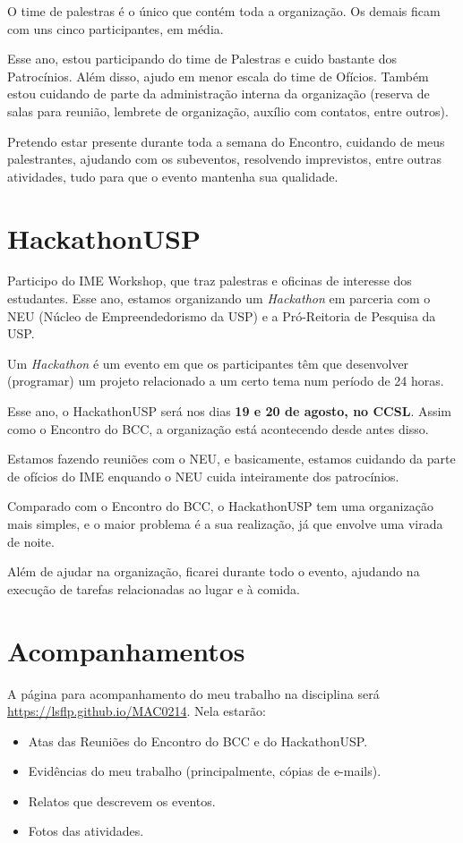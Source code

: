 \documentclass[12pt,letterpaper]{article}
\begin{document}
	O time de palestras é o único que contém toda a organização. Os demais ficam com uns cinco participantes, em média. 
	
	Esse ano, estou participando do time de Palestras e cuido bastante dos Patrocínios. Além disso, ajudo em menor escala do time de Ofícios. Também estou cuidando de parte da administração interna da organização (reserva de salas para reunião, lembrete de organização, auxílio com contatos, entre outros).
	
	Pretendo estar presente durante toda a semana do Encontro, cuidando de meus palestrantes, ajudando com os subeventos, resolvendo imprevistos, entre outras atividades, tudo para que o evento mantenha sua qualidade.
	
	\section{HackathonUSP}
	
	Participo do IME Workshop, que traz palestras e oficinas de interesse dos estudantes. Esse ano, estamos organizando um \textit{Hackathon} em parceria com o NEU (Núcleo de Empreendedorismo da USP) e a Pró-Reitoria de Pesquisa da USP.
	
	Um \textit{Hackathon} é um evento em que os participantes têm que desenvolver (programar) um projeto relacionado a um certo tema num período de 24 horas. 
	
	Esse ano, o HackathonUSP será nos dias \textbf{19 e 20 de agosto, no CCSL}. Assim como o Encontro do BCC, a organização está acontecendo desde antes disso. 
	
	Estamos fazendo reuniões com o NEU, e basicamente, estamos cuidando da parte de ofícios do IME enquando o NEU cuida inteiramente dos patrocínios.
	
	Comparado com o Encontro do BCC, o HackathonUSP tem uma organização mais simples, e o maior problema é a sua realização, já que envolve uma virada de noite. 
	
	Além de ajudar na organização, ficarei durante todo o evento, ajudando na execução de tarefas relacionadas ao lugar e à comida.
	
	\section{Acompanhamentos}
	
	A página para acompanhamento do meu trabalho na disciplina será \url{https://lsflp.github.io/MAC0214}. Nela estarão:
	
	\begin{itemize}
		\item Atas das Reuniões do Encontro do BCC e do HackathonUSP.
		\item Evidências do meu trabalho (principalmente, cópias de e-mails).
		\item Relatos que descrevem os eventos.
		\item Fotos das atividades.
	\end{itemize}

			 
\end{document}
